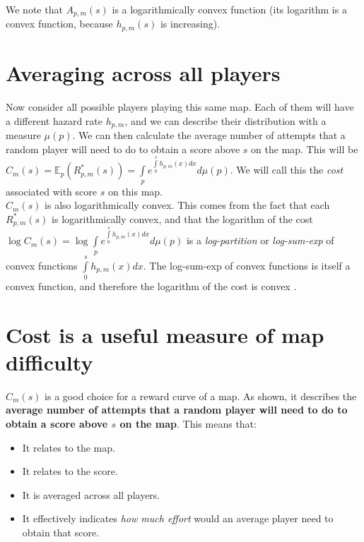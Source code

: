 \documentclass[12pt,a4paper]{article}
\begin{document}
We note that $A_{p,m}(s)$ is a logarithmically convex function (its logarithm is a convex function, because $h_{p,m}(s)$ is increasing).

\section{Averaging across all players}

Now consider all possible players playing this same map. Each of them will have a different hazard rate $h_{p,m}$, and we can describe their distribution with a measure $\mu(p)$. We can then calculate the average number of attempts that a random player will need to do to obtain a score above $s$ on the map. This will be $C_m(s) = \mathbb{E}_p(R_{p,m}^{*}(s)) = \int\limits_p e^{\int\limits_0^s h_{p,m}(x) dx} d\mu(p)$. We will call this the {\emph{cost}} associated with score $s$ on this map.\\

$C_m(s)$ is also logarithmically convex. This comes from the fact that each $R_{p,m}^{*}(s)$ is logarithmically convex, and that the logarithm of the cost $\log C_m(s) = \log \int\limits_p e^{\int\limits_0^s h_{p,m}(x) dx} d\mu(p)$ is a {\emph{log-partition}} or {\emph{log-sum-exp}} of convex functions $\int\limits_0^s h_{p,m}(x) dx$. The log-sum-exp of convex functions is itself a convex function, and therefore the logarithm of the cost is convex \cite{2004_boyd_convex_optimization}.

\section{Cost is a useful measure of map difficulty}

$C_m(s)$ is a good choice for a reward curve of a map. As shown, it describes the {\bf{average number of attempts that a random player will need to do to obtain a score above $s$ on the map}}. This means that:

\begin{itemize}
\item It relates to the map.
\item It relates to the score.
\item It is averaged across all players.
\item It effectively indicates {\emph{how much effort}} would an average player need to obtain that score.
\end{itemize}
\end{document}
